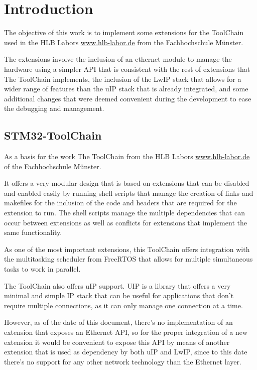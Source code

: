 \chapter{Introduction}

The objective of this work is to implement some extensions for the ToolChain used in the HLB Labors \url{www.hlb-labor.de} from the Fachhochschule Münster.

The extensions involve the inclusion of an ethernet module to manage the hardware using a simpler API that is consistent with the rest of extensions that The ToolChain implements, the inclusion of the LwIP stack that allows for a wider range of features than the uIP stack that is already integrated, and some additional changes that were deemed convenient during the development to ease the debugging and management.

\section {STM32-ToolChain}

As a basis for the work The ToolChain from the HLB Labors \url{www.hlb-labor.de} of the Fachhochschule Münster.

It offers a very modular design that is based on extensions that can be disabled and enabled easily by running shell scripts that manage the creation of links and makefiles for the inclusion of the code and headers that are required for the extension to run. The shell scripts manage the multiple dependencies that can occur between extensions as well as conflicts for extensions that implement the same functionality.

As one of the most important extensions, this ToolChain offers integration with the multitasking scheduler from FreeRTOS that allows for multiple simultaneous tasks to work in parallel.

The ToolChain also offers uIP support. UIP is a library that offers a very minimal and simple IP stack that can be useful for applications that don't require multiple connections, as it can only manage one connection at a time.

However, as of the date of this document, there's no implementation of an extension that exposes an Ethernet API, so for the proper integration of a new extension it would be convenient to expose this API by means of another extension that is used as dependency by both uIP and LwIP, since to this date there's no support for any other network technology than the Ethernet layer.

